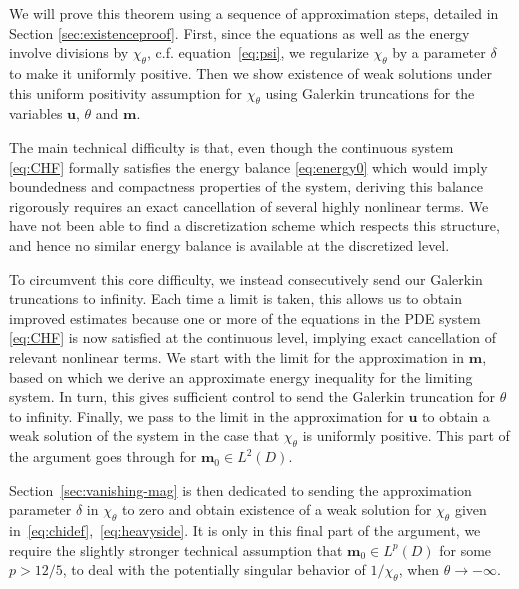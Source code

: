 \documentclass[10pt,letterpaper,twoside]{amsart}
\theoremstyle{definition}{\newtheorem{definition}[lemma]{Definition}}
\theoremstyle{note}{\newtheorem{claim}{Claim}[section]
\newtheorem*{claim*}{Claim}}
\numberwithin{equation}{section}
\newcommand{\dom}{D}
\newcommand{\bu}{\mathbf{u}}
\newcommand{\bm}{\mathbf{m}}
\begin{document}
We will prove this theorem using a sequence of approximation steps, detailed in Section \ref{sec:existenceproof}. First, since the equations as well as the energy involve divisions by $\chi_\theta$, c.f. equation~\eqref{eq:psi}, we regularize $\chi_\theta$ by a parameter $\delta$ to make it uniformly positive. Then we show existence of weak solutions under this uniform positivity assumption for $\chi_\theta$ using Galerkin truncations for the variables $\bu$, $\theta$ and $\bm$. 

The main technical difficulty is that, even though the continuous system \eqref{eq:CHF} formally satisfies the energy balance \eqref{eq:energy0} which would imply boundedness and compactness properties of the system, deriving this balance rigorously requires an exact cancellation of several highly nonlinear terms. We have not been able to find a discretization scheme which respects this structure, and hence no similar energy balance is available at the discretized level. 

To circumvent this core difficulty, we instead consecutively send our Galerkin truncations to infinity. Each time a limit is taken, this allows us to obtain improved estimates because one or more of the equations in the PDE system \eqref{eq:CHF} is now satisfied at the continuous level, implying exact cancellation of relevant nonlinear terms. We start with the limit for the approximation in $\bm$, based on which we derive an approximate energy inequality for the limiting system. In turn, this gives sufficient control to send the Galerkin truncation for $\theta$ to infinity. Finally, we pass to the limit in the approximation for $\bu$ to obtain a weak solution of the system in the case that $\chi_\theta$ is uniformly positive. This part of the argument goes through for $\bm_0\in L^2(\dom)$.

Section~\ref{sec:vanishing-mag} is then dedicated to sending the approximation parameter $\delta$ in $\chi_\theta$ to zero and obtain existence of a weak solution for $\chi_\theta$ given in~\eqref{eq:chidef},~\eqref{eq:heavyside}. It is only in this final part of the argument, we require the slightly stronger technical assumption that $\bm_0\in L^p(\dom)$ for some $p>12/5$, to deal with the potentially singular behavior of $1/\chi_\theta$, when $\theta \to -\infty$.
\end{document}
